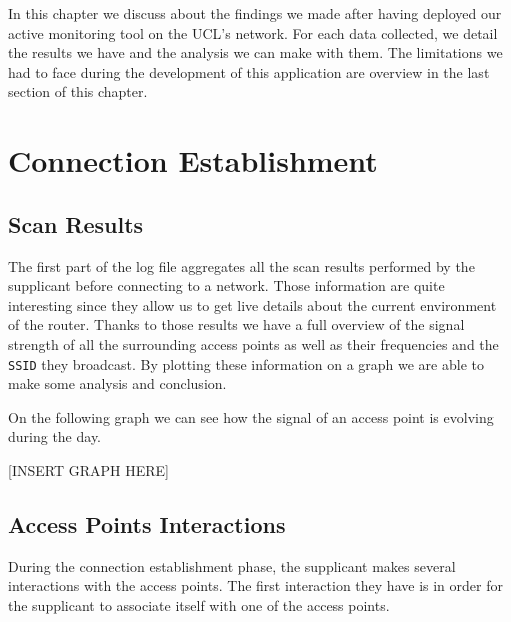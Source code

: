 In this chapter we discuss about the findings we made after having deployed our active monitoring tool on the UCL's network. For each data collected, we detail the results we have and the analysis we can make with them. The limitations we had to face during the development of this application are overview in the last section of this chapter.


\section{Connection Establishment}

\subsection{Scan Results}
The first part of the log file aggregates all the scan results performed by the supplicant before connecting to a network. Those information are quite interesting since they allow us to get live details about the current environment of the router. Thanks to those results we have a full overview of the signal strength of all the surrounding access points as well as their frequencies and the \texttt{SSID} they broadcast. By plotting these information on a graph we are able to make some analysis and conclusion.

On the following graph we can see how the signal of an access point is evolving during the day. 

[INSERT GRAPH HERE]



\subsection{Access Points Interactions}
During the connection establishment phase, the supplicant makes several interactions with the access points. The first interaction they have is in order for the supplicant to associate itself with one of the access points. 


